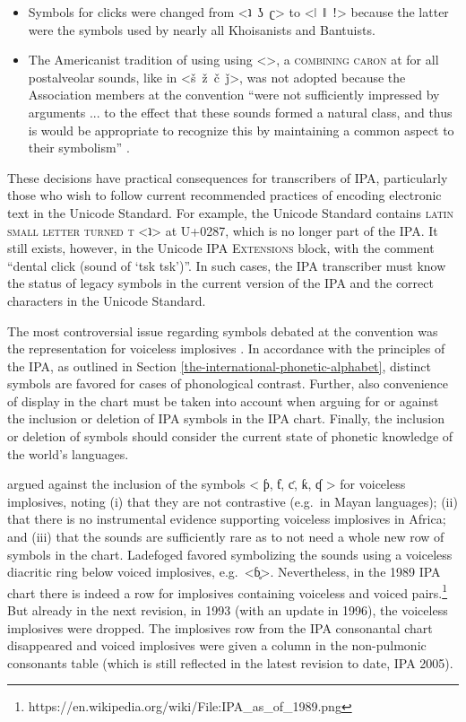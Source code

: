 \begin{itemize}
	\item Symbols for clicks were changed from <ʇ~ʖ~ʗ> to <ǀ~ǁ~ǃ>
       because the latter were the symbols used by nearly all Khoisanists and
       Bantuists.
	\item The Americanist tradition of using using <>, a
       \textsc{combining caron} at  for all postalveolar sounds, like
       in <š~ž~č~ǰ>, was not adopted because the Association members at the
       convention ``were not sufficiently impressed by arguments ... to the
       effect that these sounds formed a natural class, and thus is would be
       appropriate to recognize this by maintaining a common aspect to their
       symbolism'' \citep[62]{Ladefoged1990a}. 
\end{itemize}

\noindent These decisions have practical consequences for transcribers 
of IPA, particularly those who wish to follow current recommended practices of 
encoding electronic text in the Unicode Standard. For example, the Unicode 
Standard contains \textsc{latin small letter turned t} <ʇ> at U+0287, 
which is no longer part of the IPA. It still exists, however, in the Unicode 
\textsc{IPA Extensions} block, with the comment ``dental click (sound of `tsk tsk')''. 
In such cases, the IPA transcriber must know the status of legacy symbols in the current 
version of the IPA and the correct characters in the Unicode Standard.

The most controversial issue regarding symbols debated at the convention was the
representation for voiceless implosives \citep[62]{Ladefoged1990a}. In
accordance with the principles of the IPA, as outlined in Section
\ref{the-international-phonetic-alphabet}, distinct symbols are favored for
cases of phonological contrast. Further, also convenience of display in the chart
must be taken into account when arguing for or against the inclusion or deletion
of IPA symbols in the IPA chart. Finally, the inclusion or deletion of symbols
should consider the current state of phonetic knowledge of the world's
languages.

\citet{Ladefoged1990a} argued against the inclusion of the symbols < ƥ, ƭ, ƈ, ƙ,
ʠ > for voiceless implosives, noting (i) that they are not contrastive (e.g.\ in
Mayan languages); (ii) that there is no instrumental evidence supporting
voiceless implosives in Africa; and (iii) that the sounds are sufficiently rare
as to not need a whole new row of symbols in the chart. Ladefoged favored
symbolizing the sounds using a voiceless diacritic ring below voiced implosives,
e.g.\ <ɓ̥>. Nevertheless, in the 1989 IPA chart there is indeed a row for
implosives containing voiceless and voiced
pairs.\footnote{https://en.wikipedia.org/wiki/File:IPA\_as\_of\_1989.png} But
already in the next revision, in 1993 (with an update in 1996), the voiceless
implosives were dropped. The implosives row from the IPA consonantal chart
disappeared and voiced implosives were given a column in the non-pulmonic
consonants table (which is still reflected in the latest revision to date, IPA
2005).


